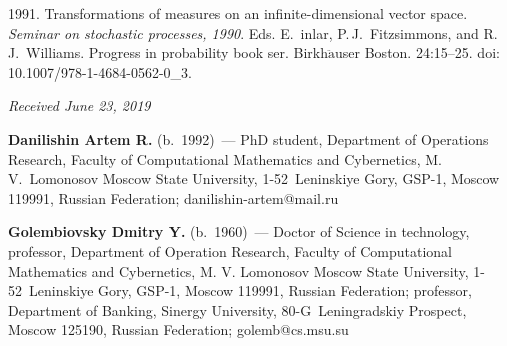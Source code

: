 \begin{multicols}{2}
{{\begin{thebibliography}{99}
 1991. Transformations of measures on an infinite-dimensional vector 
space. \textit{Seminar on stochastic processes, 1990}. 
Eds. 
E.~{}inlar, P.\,J.~Fitzsimmons, and R.\,J.~Williams. 
Progress in probability book ser. 
Birkh$\ddot{\mbox{a}}$user Boston. 24:15--25. doi: 10.1007/978-1-4684-0562-0\_3.


\end{thebibliography}

 }
 }

\end{multicols}


\hfill{\small\textit{Received June 23, 2019}}



\Contr

\noindent
\textbf{Danilishin Artem R.} (b.\ 1992)~--- PhD student, Department of Operations Research, Faculty of 
Computational Mathematics and Cybernetics, M.\,V.~Lomonosov Moscow State University,  
1-52~Leninskiye Gory, GSP-1, Moscow 119991, Russian Federation; \mbox{danilishin-artem@mail.ru}

\vspace*{3pt}

\noindent
\textbf{Golembiovsky Dmitry Y.} (b.\ 1960)~--- Doctor of Science in technology, professor, Department of 
Operation Research, Faculty of Computational Mathematics and Cybernetics, M. V. Lomonosov Moscow 
State University, 1-52~Leninskiye Gory, GSP-1, Moscow 119991, Russian Federation; professor, Department 
of Banking, Sinergy University, 80-G~Leningradskiy Prospect, Moscow 125190, Russian Federation; 
\mbox{golemb@cs.msu.su}
   
\label{end\stat}

\renewcommand{\bibname}{\protect\rm Литература} 